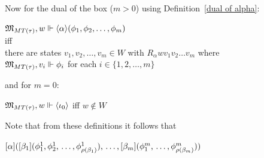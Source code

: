 \begin{definition}







\end{definition}

\begin{remark}

\par Now for the dual of the box ($m > 0$) using Definition~\ref{dual of alpha}:

    \begin{center}

        $\mathfrak{M}_{MT(\tau)},  w \Vdash \langle\alpha\rangle(\phi_1,\phi_2,\ldots,\phi_m)$\\

        iff\\

        there are states $v_1,v_2, \ldots, v_m \in W$ with $R_{\alpha}wv_1v_2\ldots v_m$ where \\

        $\mathfrak{M}_{MT(\tau)}, v_i\Vdash\phi_i$ for each $i \in \{1,2,\ldots,m \}$

    \end{center}

\par and for $m=0$:

    \begin{center}

        $\mathfrak{M}_{MT(\tau)},  w \Vdash \langle\iota_0\rangle$ \quad iff \quad $w\not\in W$

    \end{center}
\end{remark}



\par Note that from these definitions it follows that

\begin{center}

    $[\alpha]([\beta_1](\phi_1^1\text{,\,}\phi_2^1\text{,\,}\ldots \text{,\,}\phi_{\rho(\beta_1)}^1)\text{,\,} \ldots \text{,\,} [\beta_{m}](\phi_1^m \text{,\,}\ldots \text{,\,}\phi_{\rho(\beta_m)}^m))$

\end{center}

